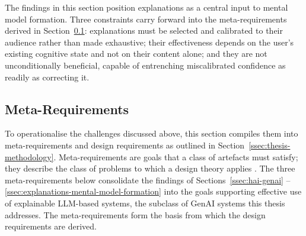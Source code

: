 The findings in this section position explanations as a central input to mental model formation. Three constraints carry forward into the meta-requirements derived in Section~\ref{ssec:meta-requirements}: explanations must be selected and calibrated to their audience rather than made exhaustive; their effectiveness depends on the user's existing cognitive state and not on their content alone; and they are not unconditionally beneficial, capable of entrenching miscalibrated confidence as readily as correcting it.

\subsection{Meta-Requirements} \label{ssec:meta-requirements}

To operationalise the challenges discussed above, this section compiles them into meta-requirements and design requirements as outlined in Section~\ref{ssec:thesis-methodology}. Meta-requirements are goals that a class of artefacts must satisfy; they describe the class of problems to which a design theory applies \parencite{Walls1992}. The three meta-requirements below consolidate the findings of Sections~\ref{ssec:hai-genai} -- \ref{ssec:explanations-mental-model-formation} into the goals supporting effective use of explainable \ac{LLM}-based systems, the subclass of \ac{GenAI} systems this thesis addresses. The meta-requirements form the basis from which the design requirements are derived.

\pagebreak

